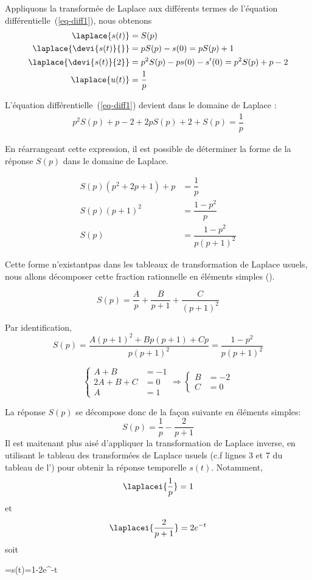 Appliquons la transformée de Laplace aux différents termes de l'équation différentielle~(\ref{eq-diff1}),
nous obtenons
\begin{align*}
    \laplace{s(t)} &= S(p) \\
    \laplace{\devi{s(t)}{}} &= pS(p)-s(0) = pS(p) +1 \\
    \laplace{\devi{s(t)}{2}} &= p^2S(p)-ps(0)-s'(0) = p^2S(p) + p -2\\
    \laplace{u(t)} &= \dfrac{1}{p}
\end{align*}

L'équation différentielle~(\ref{eq-diff1}) devient dans le domaine de Laplace :
\begin{align*}
p^2S(p)+p-2+2pS(p)+2+S(p)=\dfrac{1}{p} 
\end{align*}

En réarrangeant cette expression, il est possible de déterminer la forme de la réponse 
$S(p)$ dans le domaine de Laplace.

\begin{align*}
    S(p)\left(p^2+2p+1\right)+p&=\dfrac{1}{p} \\
    S(p)\left(p+1\right)^2 &= \dfrac{1-p^2}{p}\\
    S(p)&= \dfrac{1-p^2}{p\left(p+1\right)^2}
\end{align*}

Cette forme \og n'existant\fg pas dans les tableaux de transformation de Laplace usuels, nous allons décomposer cette
fraction rationnelle en éléments simples ().

$$
S(p)=\dfrac{A}{p}+\dfrac{B}{p+1}+\dfrac{C}{(p+1)^2}
$$

Par identification, 
$$
S(p)=\dfrac{A(p+1)^2+Bp(p+1)+Cp}{p(p+1)^2}=\dfrac{1-p^2}{p\left(p+1\right)^2}
$$

$$
\begin{cases}
    A+B&=-1 \\
    2A+B+C&=0 \\
    A&=1   
\end{cases}\Rightarrow
\begin{cases}
    B&=-2\\
    C&=0
\end{cases}
$$

La réponse $S(p)$ se décompose donc de la façon suivante en éléments simples:
$$
S(p)=\dfrac{1}{p}-\dfrac{2}{p+1}
$$
Il est maitenant plus aisé d'appliquer la transformation de Laplace inverse, 
en utilisant le tableau des transformées de Laplace usuels (c.f lignes 3 et 7 du tableau de l') 
pour obtenir la réponse temporelle $s(t)$. Notamment,
$$
\laplacei{\dfrac{1}{p}}=1
$$
et
$$
\laplacei{\dfrac{2}{p+1}}=2e^{-t}
$$
soit 
\begin{bequation}
    =s(t)=1-2e^{-t}
\end{bequation}

